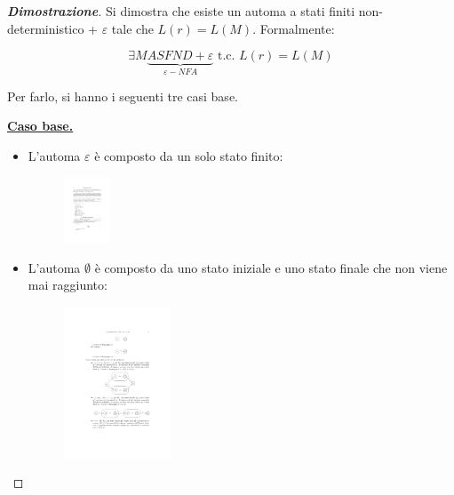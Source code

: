 \documentclass[a4paper]{article}
\begin{document}
	\begin{proof}[\textbf{Dimostrazione}]
		Si dimostra che esiste un automa a stati finiti non-deterministico + $\varepsilon$ tale che $L\left(r\right) = L\left(M\right)$. Formalmente:
		
		\begin{equation*}
			\exists M \underbrace{ASFND+\varepsilon}_{\varepsilon-NFA} \text{ t.c. } L\left(r\right) = L\left(M\right)
		\end{equation*}
	
		\noindent
		Per farlo, si hanno i seguenti tre casi base.\newline
		
		\noindent
		\textbf{\underline{Caso base.}}
		
		\begin{itemize}
			\item L'automa $\varepsilon$ è composto da un solo stato finito:
				\begin{figure}[!htp]
					\centering
					\includegraphics[width=0.13\textwidth]{img/teorema_McN-Yamada1.pdf}
				\end{figure}
			
			\item L'automa $\emptyset$ è composto da uno stato iniziale e uno stato finale che non viene mai raggiunto:
				\begin{figure}[!htp]
					\centering
					\includegraphics[width=0.3\textwidth]{img/teorema_McN-Yamada2.pdf}
				\end{figure}
			

\end{itemize}
\end{proof}
\end{document}
